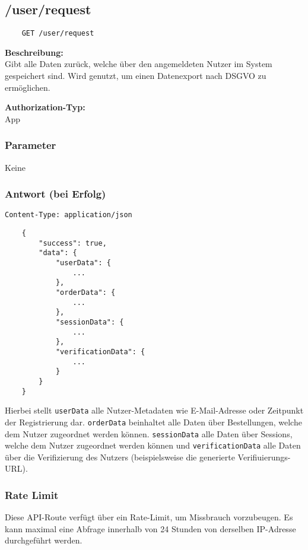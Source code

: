 \subsection{/user/request}

\begin{lstlisting}
    GET /user/request
\end{lstlisting}

\textbf{Beschreibung:} \\
Gibt alle Daten zurück, welche über den angemeldeten Nutzer im System gespeichert sind. Wird genutzt, um einen Datenexport nach DSGVO zu ermöglichen.

\textbf{Authorization-Typ:} \\
App

\subsubsection{Parameter}

Keine

\subsubsection{Antwort (bei Erfolg)}

\lstinline{Content-Type: application/json}
\begin{lstlisting}
    {
        "success": true, 
        "data": {
            "userData": {
                ...
            },
            "orderData": {
                ...
            },
            "sessionData": {
                ...
            },
            "verificationData": {
                ...
            }
        }
    }
\end{lstlisting}

Hierbei stellt \lstinline{userData} alle Nutzer-Metadaten wie E-Mail-Adresse oder Zeitpunkt der Registrierung dar. \lstinline{orderData} beinhaltet alle Daten über Bestellungen, welche dem Nutzer zugeordnet werden können. \lstinline{sessionData} alle Daten über Sessions, welche dem Nutzer zugeordnet werden können und \lstinline{verificationData} alle Daten über die Verifizierung des Nutzers (beispielsweise die generierte Verifiuierungs-URL).

\subsubsection{Rate Limit}

Diese API-Route verfügt über ein Rate-Limit, um Missbrauch vorzubeugen. Es kann maximal eine Abfrage innerhalb von 24 Stunden von derselben IP-Adresse durchgeführt werden.